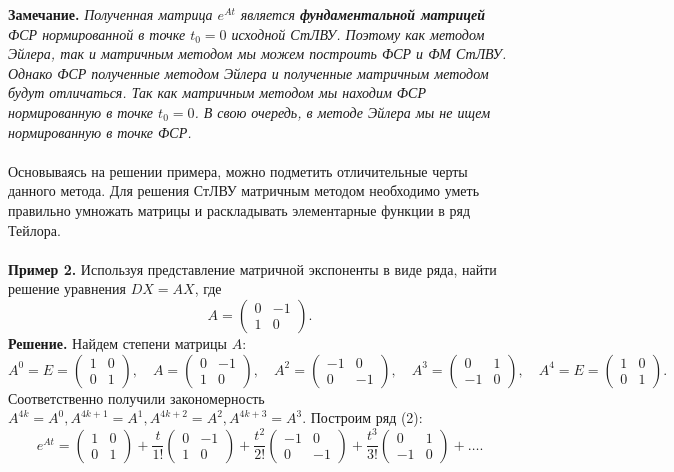 \documentclass[a4paper, 12pt]{article}
\begin{document}
\textbf{Замечание.} \textit{Полученная матрица $e^{At}$ является \textbf{фундаментальной матрицей} ФСР нормированной в точке $t_0 = 0$ исходной СтЛВУ. Поэтому как методом Эйлера, так и матричным методом мы можем построить ФСР и ФМ СтЛВУ. Однако ФСР полученные методом Эйлера и полученные матричным методом будут отличаться. Так как матричным методом мы находим ФСР нормированную в точке $t_0 = 0$. В свою очередь, в методе Эйлера мы не ищем нормированную в точке ФСР.}\\\\
Основываясь на решении примера, можно подметить отличительные черты данного метода. Для решения СтЛВУ матричным методом необходимо уметь правильно умножать матрицы и раскладывать элементарные функции в ряд Тейлора.\\\\
\textbf{Пример 2.} Используя представление матричной экспоненты в виде ряда, найти решение уравнения $DX = AX$, где
$$A = \begin{pmatrix}
	0 & -1 \\
	1 & 0
\end{pmatrix}.$$
\textbf{Решение.} Найдем степени матрицы $A$:
$$A^0 = E = \begin{pmatrix}
	1 & 0\\
	0 & 1
\end{pmatrix},\quad A = \begin{pmatrix}
	0 & -1 \\
	1 & 0
\end{pmatrix},\quad A^2 = \begin{pmatrix}
	-1 & 0 \\
	0 & -1
\end{pmatrix},\quad A^3 = \begin{pmatrix}
	0 & 1 \\
	-1 & 0
\end{pmatrix}, \quad A^4 = E = \begin{pmatrix}
1 & 0\\
0 & 1
\end{pmatrix}.$$
Соответственно получили закономерность $A^{4k} = A^0, A^{4k + 1} = A^1, A^{4k + 2} = A^2, A^{4k+3} = A^3$. Построим ряд (2):
$$e^{At} = \begin{pmatrix}
	1 & 0\\
	0 & 1
\end{pmatrix} + \dfrac{t}{1!}\begin{pmatrix}
	0 & -1 \\
	1 & 0
\end{pmatrix} +\dfrac{t^2}{2!}\begin{pmatrix}
	-1 & 0 \\
	0 & -1
\end{pmatrix} + \dfrac{t^3}{3!}\begin{pmatrix}
	0 & 1 \\
	-1 & 0
\end{pmatrix} + \ldots.$$
\end{document}
